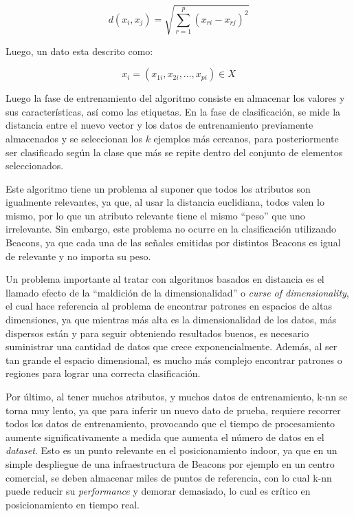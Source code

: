 \begin{equation} 
d(x_{i}, x_{j}) = \sqrt{\sum_{r=1}^{p}(x_{ri} -x_{rj})^{2}} 
\end{equation}

Luego, un dato esta descrito como:

\begin{equation}
x_{i} = (x_{1i}, x_{2i}, ..., x_{pi}) \in X
\end{equation}

Luego la fase de entrenamiento del algoritmo consiste en almacenar los valores y sus características, así como las etiquetas. En la fase de clasificación, se mide la distancia entre el nuevo vector y los datos de entrenamiento previamente almacenados y se seleccionan los $k$ ejemplos más cercanos, para posteriormente ser clasificado según la clase que más se repite dentro del conjunto de elementos seleccionados.

Este algoritmo tiene un problema al suponer que todos los atributos son igualmente relevantes, ya que, al usar la distancia euclidiana, todos valen lo mismo, por lo que un atributo relevante tiene el mismo ``peso'' que uno irrelevante. Sin embargo, este problema no ocurre en la clasificación utilizando Beacons, ya que cada una de las señales emitidas por distintos Beacons es igual de relevante y no importa su peso.

Un problema importante al tratar con algoritmos basados en distancia es el llamado efecto de la ``maldición de la dimensionalidad'' o \textit{curse of dimensionality}, el cual hace referencia al problema de encontrar patrones en espacios de altas dimensiones, ya que mientras más alta es la dimensionalidad de los datos, más dispersos están y para seguir obteniendo resultados buenos, es necesario suministrar una cantidad de datos que crece exponencialmente. Además, al ser tan grande el espacio dimensional, es mucho más complejo encontrar patrones o regiones para lograr una correcta clasificación.

Por último, al tener muchos atributos, y muchos datos de entrenamiento, k-nn se torna muy lento, ya que para inferir un nuevo dato de prueba, requiere recorrer todos los datos de entrenamiento, provocando que el tiempo de procesamiento aumente significativamente a medida que aumenta el número de datos en el \textit{dataset}. Esto es un punto relevante en el posicionamiento indoor, ya que en un simple despliegue de una infraestructura de Beacons por ejemplo en un centro comercial, se deben almacenar miles de puntos de referencia, con lo cual k-nn puede reducir su \textit{performance} y demorar demasiado, lo cual es crítico en posicionamiento en tiempo real.

